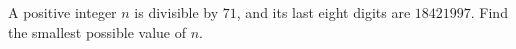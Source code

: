 A positive integer $n$ is divisible by $71$, and its last eight digits are $18421997$. Find the smallest possible value of $n$.
